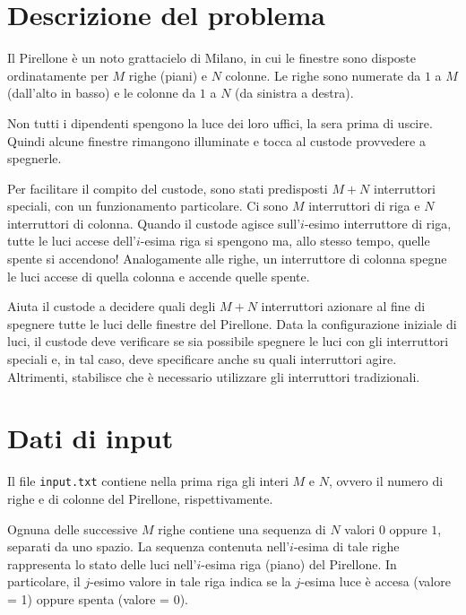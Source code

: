 \documentclass[a4paper,11pt]{article}
\begin{document}
\vspace{0.5cm}



\vspace{0.5cm}
\section*{Descrizione del problema}
  
Il Pirellone è un noto grattacielo di Milano, in cui le
finestre sono disposte ordinatamente per $M$ righe (piani) e
$N$ colonne. Le righe sono numerate da $1$ a $M$
(dall'alto in basso) e le colonne da $1$ a $N$ (da sinistra a
destra).

Non tutti i dipendenti spengono la luce dei loro uffici, la sera prima
di uscire. Quindi alcune finestre rimangono illuminate e tocca al
custode provvedere a spegnerle.

Per facilitare il compito del custode, sono stati predisposti
$M+N$ interruttori speciali, con un funzionamento
particolare.  Ci sono $M$ interruttori di riga e $N$
interruttori di colonna.  Quando il custode agisce
sull'$i$-esimo interruttore di riga, tutte le luci accese
dell'$i$-esima riga si spengono ma, allo stesso tempo, quelle
spente si accendono! Analogamente alle righe, un interruttore di
colonna spegne le luci accese di quella colonna e accende quelle
spente.

Aiuta il custode a decidere quali degli $M+N$
interruttori azionare al fine di spegnere tutte le luci delle finestre
del Pirellone. Data la configurazione iniziale di luci, il custode
deve verificare se sia possibile spegnere le luci con gli interruttori
speciali e, in tal caso, deve specificare anche su quali interruttori
agire. Altrimenti, stabilisce che è necessario utilizzare gli
interruttori tradizionali.


\section*{Dati di input}
  
Il file \texttt{input.txt} contiene nella prima riga gli interi
$M$ e $N$, ovvero il numero di righe e di colonne
del Pirellone, rispettivamente.

Ognuna delle successive $M$ righe contiene una sequenza di
$N$ valori $0$ oppure $1$, separati da uno spazio.  La sequenza
contenuta nell'$i$-esima di tale righe rappresenta lo stato
delle luci nell'$i$-esima riga (piano) del Pirellone. In
particolare, il $j$-esimo valore in tale riga indica se la
$j$-esima luce è accesa (valore = 1) oppure spenta
(valore = 0).
\end{document}

